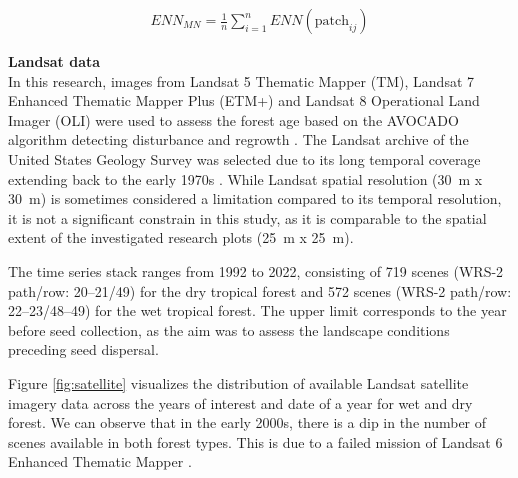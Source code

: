 \begin{align}
\label{eq:eucledean}
ENN_{MN} = \frac{1}{n} \sum_{i=1}^{n} ENN(\text{patch}_{ij})
\end{align}

\textbf{Landsat data}\\

In this research, images from Landsat 5 Thematic Mapper (TM), Landsat 7 Enhanced Thematic Mapper Plus (ETM+) and Landsat 8 Operational Land Imager (OLI) were used to assess the forest age based on the AVOCADO algorithm detecting disturbance and regrowth \citep{decuyperContinuousMonitoringForest2022}. The Landsat archive of the United States Geology Survey was selected due to its long temporal coverage extending back to the early 1970s \citep{kennedyBringingEcologicalView2014, finerCombatingDeforestationSatellite2018}. While Landsat spatial resolution (30~m x 30~m) is sometimes considered a limitation compared to its temporal resolution, it is not a significant constrain in this study, as it is comparable to the spatial extent of the investigated research plots (25~m x 25~m). 

The time series stack ranges from 1992 to 2022, consisting of 719 scenes (WRS-2 path/row: 20–21/49) for the dry tropical forest and 572 scenes (WRS-2 path/row: 22–23/48–49) for the wet tropical forest. The upper limit corresponds to the year before seed collection, as the aim was to assess the landscape conditions preceding seed dispersal.

Figure \ref{fig:satellite} visualizes the distribution of available Landsat satellite imagery data across the years of interest and date of a year for wet and dry forest. We can observe that in the early 2000s, there is a dip in the number of scenes available in both forest types. This is due to a failed mission of Landsat 6 Enhanced Thematic Mapper \citep{gowardHistoricalRecordLandsat2006}.

